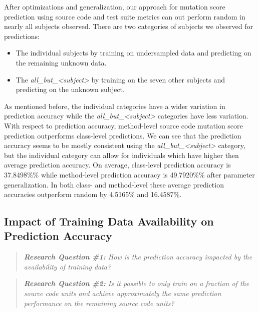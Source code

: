 After optimizations and generalization, our approach for mutation score prediction using source code and test suite metrics can out perform random in nearly all subjects observed. There are two categories of subjects we observed for predictions:

\begin{itemize}
  \item The individual subjects by training on undersampled data and predicting on the remaining unknown data.
  \item The \emph{all\_but\_<subject>} by training on the seven other subjects and predicting on the unknown subject.
\end{itemize}

As mentioned before, the individual categories have a wider variation in prediction accuracy while the \emph{all\_but\_<subject>} categories have less variation. With respect to prediction accuracy, method-level source code mutation score prediction outperforms class-level predictions. We can see that the prediction accuracy seems to be mostly consistent using the \emph{all\_but\_<subject>} category, but the individual category can allow for individuals which have higher then average prediction accuracy. On average, class-level prediction accuracy is 37.8498\%\% while method-level prediction accuracy is 49.7920\%\% after parameter generalization. In both class- and method-level these average prediction accuracies outperform random by 4.5165\% and 16.4587\%.


\subsection{Impact of Training Data Availability on Prediction Accuracy}
\label{subsec:experiment_data}
\begin{quote}
	\emph{\textbf{Research Question \#1:} How is the prediction accuracy impacted by the availability of training data?}
\end{quote}

\begin{quote}
  \emph{\textbf{Research Question \#2:} Is it possible to only train on a fraction of the source code units and achieve approximately the same prediction performance on the remaining source code units?}
\end{quote}

